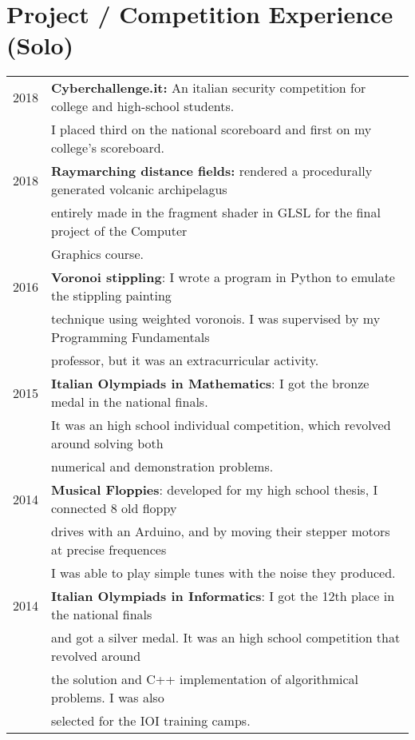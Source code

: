 \documentclass[a4paper,10pt]{article} %
\begin{document}
\bigskip


\section{Project / Competition Experience (Solo)}
\begin{tabular}{rl}
2018 &  \textbf{Cyberchallenge.it:} An italian security competition for college and high-school students.\\
	 & I placed third on the national scoreboard and first on my college's scoreboard.\\
2018 &  \textbf{Raymarching distance fields:} rendered a procedurally generated volcanic archipelagus \\
     & entirely made in the fragment shader in GLSL for the final project of the Computer \\
     & Graphics course.  \\
2016 &  \textbf{Voronoi stippling}: I wrote a program in Python to emulate the stippling painting \\
     & technique using weighted voronois. I was supervised by my Programming Fundamentals \\
     & professor, but it was an extracurricular activity. \\
2015 &  \textbf{Italian Olympiads in Mathematics}: I got the bronze medal in the national finals. \\
     & It was an high school individual competition, which revolved around solving both \\
     & numerical and demonstration problems. \\
2014 &  \textbf{Musical Floppies}: developed for my high school thesis, I connected 8 old floppy \\
     & drives with an Arduino, and by moving their stepper motors at precise frequences \\
     & I was able to play simple tunes with the noise they produced.\\
2014 &  \textbf{Italian Olympiads in Informatics}: I got the 12th place in the national finals \\
     & and got a silver medal. It was an high school competition that revolved around \\
     & the solution and C++ implementation of algorithmical problems. I was also \\
     & selected for the IOI training camps. \\
\end{tabular}
\end{document}
